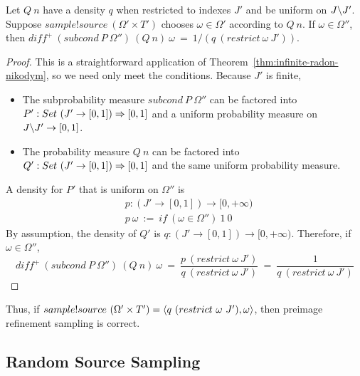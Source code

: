 \begin{theorem}
Let $Q~n$ have a density $q$ when restricted to indexes $J'$ and be uniform on $J \backslash J'$.
Suppose $sample!source~(\Omega' \times T')$ chooses $\omega \in \Omega'$ according to $Q~n$.
If $\omega \in \Omega''$, then $diff^+~(subcond~P~\Omega'')~(Q~n)~\omega\ =\ 1{/}(q~(restrict~\omega~J'))$.
\end{theorem}
\begin{proof}
This is a straightforward application of Theorem~\ref{thm:infinite-radon-nikodym}, so we need only meet the conditions.
Because $J'$ is finite,
\begin{itemize}
	\item The subprobability measure $subcond~P~\Omega''$ can be factored into $P' : Set~(J' \to [0,1]) \Rightarrow [0,1]$ and a uniform probability measure on $J \backslash J' \to [0,1]$.
	\item The probability measure $Q~n$ can be factored into $Q' : Set~(J' \to [0,1]) \Rightarrow [0,1]$ and the same uniform probability measure.
\end{itemize}
A density for $P'$ that is uniform on $\Omega''$ is
\begin{equation}
\begin{aligned}
	&p : (J' \to [0,1]) \to [0,+\infty) \\
	&p~\omega\ :=\ if~(\omega \in \Omega'')~1~0
\end{aligned}
\end{equation}
By assumption, the density of $Q'$ is $q : (J' \to [0,1]) \to [0,+\infty)$.
Therefore, if $\omega \in \Omega''$,
\begin{equation}
	diff^+~(subcond~P~\Omega'')~(Q~n)~\omega
		\ =\ \frac{p~(restrict~\omega~J')}{q~(restrict~\omega~J')}
		\ =\ \frac{1}{q~(restrict~\omega~J')}
\end{equation}
\end{proof}

Thus, if $sample!source~(\Omega' \times T') = \langle{q~(restrict~\omega~J'), \omega}\rangle$, then preimage refinement sampling is correct.

\subsection{Random Source Sampling}

